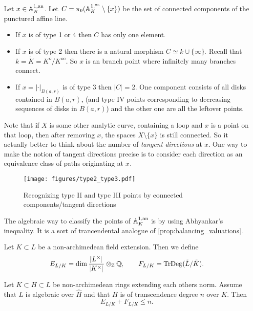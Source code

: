 \begin{proposition}
	Let $x \in \mathbb{A}_K^{1,\text{an}}$. 
	Let $C = \pi_0(\mathbb{A}_K^{1, {}^{\text{an}}}\setminus \{ x\} )$ be the set of connected components of the punctured affine line. 
	\begin{itemize}
		\item If $x$ is of type 1  or 4 then $C$ has only one element.
		\item If $x$ is of type 2 then there is a natural morphism $C \simeq k \cup \{\infty\} $. Recall that $k = \tilde K = K^{o} / K^{oo} $. 
			So $x$ is an branch point where infinitely many branches connect. 
		\item If $x = |\cdot |_{B(a, r)}$ is of type 3 then $|C| = 2$. One component consists of all disks contained in $B(a, r)$, (and type IV points corresponding to decreasing sequences of disks in $B(a,r)$) and the other one are all the leftover points. 
	\end{itemize}
\end{proposition}
\begin{remark}
	Note that if  $X$ is some other analytic curve, containing a loop and $x$ is a point on that loop, then after removing $x$, the spaces $X \setminus \{x\} $ is still connected. 
	So it actually better to think about the number of \emph{tangent directions} at $x$. 
	One way to make the notion of tangent directions precise is to consider each direction as an equivalence class of paths originating at $x$.
\end{remark}
\begin{figure}[h]
	\centering
	\texttt{[image: figures/type2\_type3.pdf]}
	\caption{Recognizing type II and type III points by connected components/tangent directions}
	\label{fig:type2_type3}
\end{figure}


The algebraic way to classify the points of $\mathbb{A}_K^{1,\text{an}}$ is by using Abhyankar's inequality. 
It is a sort of trancendental analogue of \cref{prop:balancing_valuations}.
\begin{definition}
	Let $K \subset L$ be a non-archimedean field extension. 
	Then we define \[
		E_{ L / K} = \dim \frac{|L^{\times }|}{|K^{\times }|} \otimes_{\mathbb{Z}} \mathbb{Q}, \qquad F_{L / K} = \operatorname{TrDeg}(\tilde L / \tilde K)
	.\] 
\end{definition}

\begin{theorem}
	Let $K \subset H \subset L$ be non-archimedean rings extending each others norm. Assume that $L$ is algebraic over $\hat{H}$ and that $H$ is of transcendence degree $n$ over $K$. Then \[
	E_{L / K} + F_{L / K}  \le n
	.\] 
\end{theorem}

